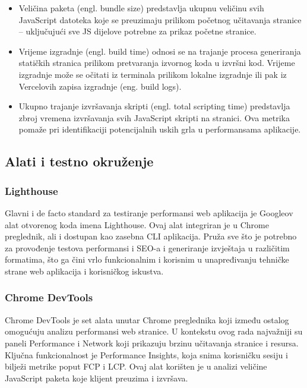 \begin{itemize}
    \item Veličina paketa (engl. bundle size) predstavlja ukupnu veličinu svih JavaScript datoteka koje se preuzimaju prilikom početnog učitavanja stranice – uključujući sve JS dijelove potrebne za prikaz početne stranice.
    \item Vrijeme izgradnje (engl. build time) odnosi se na trajanje procesa generiranja statičkih stranica prilikom pretvaranja izvornog koda u izvršni kod. Vrijeme izgradnje može se očitati iz terminala prilikom lokalne izgradnje ili pak iz Vercelovih zapisa izgradnje (eng. build logs).
    \item Ukupno trajanje izvršavanja skripti (engl. total scripting time) predstavlja zbroj vremena izvršavanja svih JavaScript skripti na stranici. Ova metrika pomaže pri identifikaciji potencijalnih uskih grla u performansama aplikacije.
\end{itemize}

\subsection{Alati i testno okruženje}

\subsubsection{Lighthouse}

Glavni i de facto standard za testiranje performansi web aplikacija je Googleov alat otvorenog koda imena Lighthouse. Ovaj alat integriran je u Chrome preglednik, ali i dostupan kao zasebna CLI aplikacija. Pruža sve što je potrebno za provođenje testova performansi i SEO-a i generiranje izvještaja u različitim formatima, što ga čini vrlo funkcionalnim i korisnim u unapređivanju tehničke strane web aplikacija i korisničkog iskustva. \cite{googlelighthouse}

\subsubsection{Chrome DevTools}

Chrome DevTools je set alata unutar Chrome preglednika koji između ostalog omogućuju analizu performansi web stranice. U kontekstu ovog rada najvažniji su paneli Performance i Network koji prikazuju brzinu učitavanja stranice i resursa. Ključna funkcionalnost je Performance Insights, koja snima korisničku sesiju i bilježi metrike poput FCP i LCP. Ovaj alat korišten je u analizi veličine JavaScript paketa koje klijent preuzima i izvršava. \cite{nordstrom2023comparison}

